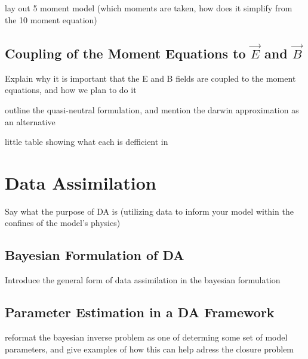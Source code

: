 \documentclass[titlepage,12pt,letterpaper]{article}
\begin{document}
lay out 5 moment model (which moments are taken, how does it simplify from the 10 moment equation)


\subsection{Coupling of the Moment Equations to $\vec{E}$ and $\vec{B}$}\label{plasma:coupleing_to_E_and_B}

Explain why it is important that the E and B fields are coupled to the moment equations, and how we plan to do it

outline the quasi-neutral formulation, and mention the darwin approximation as an alternative

little table showing what each is defficient in



\section{Data Assimilation}\label{DA}

Say what the purpose of DA is (utilizing data to inform your model within the confines of the model's physics)


\subsection{Bayesian Formulation of DA}\label{DA:bayesian}

Introduce the general form of data assimilation in the bayesian formulation


\subsection{Parameter Estimation in a DA Framework}\label{DA:parameter_estimation}

reformat the bayesian inverse problem as one of determing some set of model parameters, and give examples of how this can help adress the closure problem
\end{document}
